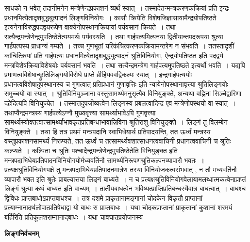 \documentclass[11pt, openany]{book}
\begin{document}
\noindent 
साधको न भवेत् तदानीमनेन मन्त्रेणेन्द्रप्रकाशनं व्यर्थं स्यात्~। तस्मादेतन्मन्त्रकरणकक्रियां प्रति इन्द्रः प्रधानमित्येतादृशबुद्ध्युत्पादनं लिङ्गविनियोगः~। कासौ क्रियेति विशेषजिज्ञासायामैन्द्र्योपतिष्ठते इत्यनेनाविरुद्धपदद्वयरूपेण वाक्येनोपस्थानक्रियायां पर्यवसानं क्रियते~। तथा सत्यैन्द्रमन्त्रेणेन्द्रमुपतिष्ठेतेत्ययमर्थः पर्यवस्यति~। तथा
गार्हपत्यमित्यनया द्वितीयान्तपदरूपया श्रुत्या गार्हपत्यस्य प्राधान्यं गम्यते~। तच्च गुणभूतां यत्किंचित्करणकक्रियामन्तरेण न संभवति~। ततस्तादृशीं कांचित्क्रियां प्रति गार्हपत्यः
प्रधानमित्येतादृशबुद्ध्युत्पादनं श्रुतिविनियोगः, ऐन्द्र्योपतिष्ठत इति पदद्वये मन्त्रविशेषक्रियाविशेषयोः पर्यवसानं भवति~। तथा सत्यैन्द्रमन्त्रेण गार्हपत्यमुपतिष्ठते इत्यर्थो भवति~। यद्यपि प्रमाणत्वविशेषाच्छ्रुतिलिङ्गयोर्विरोधे प्राप्ते व्रीहियववद्विकल्पः स्यात्~। इन्द्रगार्हपत्ययोः प्रधानत्वविशेषादुपस्थानस्य च गुणत्वात् {\qt प्रतिप्रधानं गुणावृत्तिः} इति न्यायेनोपस्थानावृत्त्या श्रुतिलिङ्गयोः समुच्चयो वा स्यात्~। श्रुतिर्विनियुञ्जाना वस्तुसामर्थ्यमनुसृत्यैव विनियुङ्क्ते, अन्यथा वह्निना सिञ्चेद्वारिणा दहेदित्यपि विनियुज्येत~।
तस्मात्तदुपजीव्यत्वेन लिङ्गस्य प्रबलत्वादिन्द्र एव मन्त्रेणोपस्थयो वा स्यात्~। तथाप्यैन्द्रमन्त्रस्य गार्हपत्येऽग्नौ मुख्यवृत्त्या सामर्थ्याभावेऽपि गुणवृत्त्या सामर्थ्यस्योक्तत्वात्सामर्थ्याभावकृतप्रतिबन्धाभावान्निविना श्रुतिराशु विनियुङ्क्ते~। लिङ्गं तु विलम्बेन विनियुङ्क्ते~। तथा हि \textendash  तत्र प्रथमं मन्त्रपदानि स्वाभिधेयार्थ प्रतिपादयन्ति, तत ऊर्ध्वं मन्त्रस्य वस्तुप्रकाशनसामर्थ्यं निरूप्यते, तत ऊर्ध्वं च तत्सामर्थ्यवशात्साधनत्ववाचिनी प्रधानत्ववाचिनी च श्रुतिः कल्प्यते~। कल्पिता च श्रुतिः पश्चादैन्द्रमन्त्रेणेन्द्रमुपतिष्ठेतेति विनियुङ्क्त इति मन्त्रपदाभिधेयप्रतिपादनविनियोगयोर्मध्यवर्तिनौ सामर्थ्यनिरूपणश्रुतिकल्पनव्यापारौ भवतः~। प्रत्यक्षश्रुतिविनियोगपक्षे तु
मन्त्रपदाभिधेयप्रतिपादनमात्रेण तस्या विनियोजकत्वसंभवात् , न तौ मध्यवर्तिनौ व्यापारौ भवत इति श्रुतेः प्राबल्यात्तया लिङ्गं बाध्यते~। न च प्रत्यक्षश्रुतिविनियोगवेलायामलब्धात्मकत्वेनाप्राप्तं लिङ्गं श्रुत्या कथं बाध्यत इति वाच्यम्~। तार्तीयबाधत्वेन भविष्यत्प्राप्तिप्रतिबन्धस्यैवात्र बाधत्वात्~। बाधश्च द्विविधः {\qt प्राप्तबाधोऽप्राप्तबाधश्च}~। तत्र {\br दशमे} प्राकृतानामङ्गानां चोदकेन विकृतौ प्राप्तानां प्रत्याम्नानादर्थलोपात्प्रतिषेधाद्वा यो बाधः स प्राप्तबाधः~। यथा चोदकप्राप्तानां प्राकृतानां कुशानां शरमयं बर्हिरिति प्रतिकूलशराम्नानाद्बाधः~। यथा चावघातप्रयोजनस्य
\newpage
\fancyhead[LO]{[ लिङ्गनिर्वचनम् ]}
\begin{center}
 \textbf{लिङ्गनिर्वचनम् }   
\end{center}
\end{document}
